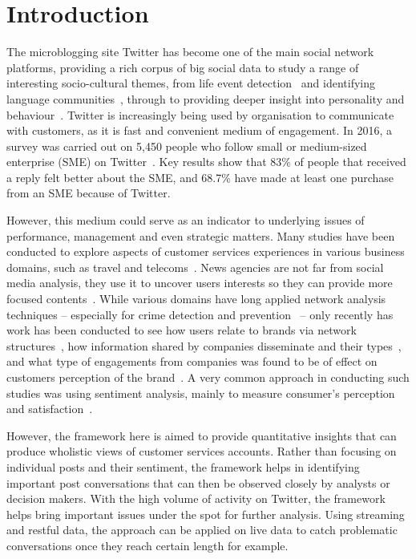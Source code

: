 \documentclass[sigconf]{acmart}
\begin{document}
\maketitle

\section{Introduction}\label{intro}

The microblogging site Twitter has become one of the main social
network platforms, providing a rich corpus of big social data to study
a range of interesting socio-cultural themes, from life event
detection~\cite{blamey-et-al-2013} and identifying language
communities~\cite{albishry-et-al:iccci2017}, through to providing
deeper insight into personality and
behaviour~\cite{mostafa-et-al-ai2016}. Twitter is increasingly being
used by organisation to communicate with customers, as it is fast and
convenient medium of engagement. In 2016, a survey was carried out on
5,450 people who follow small or medium-sized enterprise (SME) on
Twitter~\cite{Twitter2016}. Key results show that 83\% of people that
received a reply felt better about the SME, and 68.7\% have made at
least one purchase from an SME because of Twitter.

However, this medium could serve as an indicator to underlying issues
of performance, management and even strategic matters. Many studies
have been conducted to explore aspects of customer services
experiences in various business domains, such as travel and
telecoms~\cite{Shakeel2017,Zhang2016,Wattimena2017,Guercini2014,Khatoon2017}.
News agencies are not far from social media analysis, they use it to
uncover users interests so they can provide more focused
contents~\cite{Nigam2016}. While various domains have long applied
network analysis techniques -- especially for crime detection and
prevention~\cite{oatley+crick:2015,oatley-et-al:dasc2015} -- only
recently has work has been conducted to see how users relate to brands
via network structures~\cite{Cutler2017}, how information shared by
companies disseminate and their types~\cite{Piccialli2017}, and what
type of engagements from companies was found to be of effect on
customers perception of the brand~\cite{Ibrahim2017}. A very common
approach in conducting such studies was using sentiment analysis,
mainly to measure consumer's perception and
satisfaction~\cite{Zhang2016,Al-Hussaini2017}.

However, the framework here is aimed to provide quantitative insights
that can produce wholistic views of customer services accounts. Rather
than focusing on individual posts and their sentiment, the framework
helps in identifying important post conversations that can then be
observed closely by analysts or decision makers. With the high volume
of activity on Twitter, the framework helps bring important issues
under the spot for further analysis. Using streaming and restful data,
the approach can be applied on live data to catch problematic
conversations once they reach certain length for example.
\end{document}
